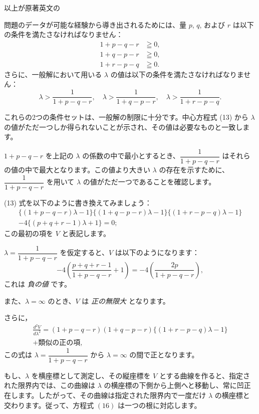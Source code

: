 \documentclass[a4paper,11pt,openany]{ltjsbook}
\begin{document}
以上が原著英文の

問題のデータが可能な経験から導き出されるためには、量 $p$, $q$, および $r$ は以下の条件を満たさなければなりません：
\[
\begin{aligned}
1 + p - q - r & \geqq 0, \\
1 + q - p - r & \geqq 0, \\
1 + r - p - q & \geqq 0.
\end{aligned}                        \tag{14}
\]
さらに、一般解において用いる $\lambda$ の値は以下の条件を満たさなければなりません：
\[
\lambda > \frac{1}{1 + p - q - r}, \quad
\lambda > \frac{1}{1 + q - p - r}, \quad
\lambda > \frac{1}{1 + r - p - q}.      \tag{15}
\]

これらの2つの条件セットは、一般解の制限に十分です。中心方程式 (13) から $\lambda$ の値がただ一つしか得られないことが示され、その値は必要なものと一致します。

$1 + p - q - r$ を上記の $\lambda$ の係数の中で最小とするとき、$\dfrac{1}{1 + p - q - r}$ はそれらの値の中で最大となります。この値より大きい $\lambda$ の存在を示すために、$\dfrac{1}{1 + p - q - r}$ を用いて $\lambda$ の値がただ一つであることを確認します。

(13) 式を以下のように書き換えてみましょう：
\begin{gather*}
\{(1 + p - q - r)\lambda - 1\} \{(1 + q - p - r)\lambda - 1\} \{(1 + r - p - q)\lambda - 1\} \\
-4\{(p + q + r - 1)\lambda + 1\} = 0;   \tag{16}
\end{gather*}
この最初の項を $V$ と表記します。

$\lambda = \dfrac{1}{1 + p - q - r}$ を仮定すると、$V$ は以下のようになります：
\[
-4\left(\frac{p + q + r - 1}{1 + p - q - r} + 1\right)
= -4\left(\frac{2p}{1 + p - q - r}\right),
\]
これは \emph{負の値} です。

また、$\lambda = \infty$ のとき、$V$ は \emph{正の無限大} となります。

さらに，
\begin{multline*}
\frac{d^2 V}{d\lambda^2}
= (1 + p - q - r)(1 + q - p - r)\{(1 + r - p - q)\lambda - 1\} \\
+ \text{類似の正の項},
\end{multline*}
この式は $\lambda = \dfrac{1}{1 + p - q - r}$ から $\lambda = \infty$ の間で正となります。

もし、$\lambda$ を横座標として測定し、その縦座標を $V$ とする曲線を作ると、指定された限界内では、この曲線は $\lambda$ の横座標の下側から上側へと移動し、常に凹正在します。したがって、その曲線は指定された限界内で一度だけ $\lambda$ の横座標と交わります。従って、方程式 $(16)$ は一つの根に対応します。
\end{document}
